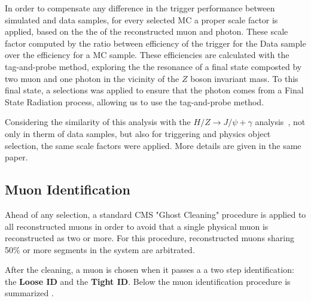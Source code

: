 In order to compensate any difference in the trigger performance between simulated and data samples, for every selected MC a proper scale factor is applied, based on the the \PT of the reconstructed muon and photon. These scale factor computed by the ratio between efficiency of the trigger for the Data sample over the efficiency for a MC sample. These efficiencies are calculated with the tag-and-probe method, exploring the the resonance of a final state composted by two muon and one photon in the vicinity of the $Z$ boson invariant mass. To this final state, a selections was applied to ensure that the photon comes from a Final State Radiation process, allowing us to use the tag-and-probe method.

Considering the similarity of this analysis with the $H/Z \rightarrow J/\psi + \gamma$ analysis~\cite{papper_jpsi}, not only in therm of data samples, but also for triggering and physics object selection, the same scale factors were applied. More details are given in the same paper.

\subsection{Muon Identification}
\label{sec:muon_id}

Ahead of any selection, a standard CMS "Ghost Cleaning" procedure is applied to all reconstructed muons in order to avoid that a single physical muon is reconstructed as two or more. For this procedure, reconstructed muons sharing 50\% or more segments in the system are arbitrated.

After the cleaning, a muon is chosen when it passes a a two step identification: the \textbf{Loose ID} and the \textbf{Tight ID}. Below the muon identification procedure is summarized .


